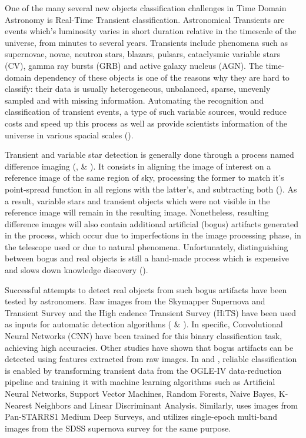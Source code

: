 \documentclass[a4paper,fleqn,usenatbib]{mnras}
\begin{document}
One of the many several new objects classification challenges in Time Domain Astronomy is Real-Time Transient classification. Astronomical Transients are events which's luminosity varies in short duration relative in the timescale of the universe, from minutes to several years. Transients include phenomena such as supernovae, novae, neutron stars, blazars, pulsars, cataclysmic variable stars (CV), gamma ray bursts (GRB) and active galaxy nucleus (AGN). The time-domain dependency of these objects is one of the reasons why they are hard to classify: their data is usually heterogeneous, unbalanced, sparse, unevenly sampled and with missing information. Automating the recognition and classification of transient events, a type of such variable sources, would reduce costs and speed up this process as well as provide scientists information of the universe in various spacial scales (\cite{2011arXiv1110.4655D}).

Transient and variable star detection is generally done through a process named difference imaging (\cite{1507.05137}, \cite{1608.01733} \& \cite{1708.02850}). It consists in aligning the image of interest on a reference image of the same region of sky, processing the former to match it's point-spread function in all regions with the latter's, and subtracting both (\cite{astro-ph/9712287}). As a result, variable stars and transient objects which were not visible in the reference image will remain in the resulting image. Nonetheless, resulting difference images will also contain additional artificial (bogus) artifacts generated in the process, which occur due to imperfections in the image processing phase, in the telescope used or due to natural phenomena. Unfortunately, distinguishing between bogus and real objects is still a hand-made process which is expensive and slows down knowledge discovery (\cite{2011arXiv1110.4655D}).


Successful attempts to detect real objects from such bogus artifacts have been tested by astronomers. Raw images from the  Skymapper Supernova and Transient Survey and the High cadence Transient Survey (HiTS) have been used as inputs for automatic detection algorithms (\cite{1708.08947} \& \cite{1701.00458}). In specific, Convolutional Neural Networks (CNN) have been trained for this binary classification task, achieving high accuracies. Other studies have shown that bogus artifacts can be detected using features extracted from raw images. In \cite{1601.06151} and \cite{1601.06320}, reliable classification is enabled by transforming transient data from the OGLE-IV data-reduction pipeline and training it with machine learning algorithms such as Artificial Neural Networks, Support Vector Machines, Random Forests, Naive Bayes, K-Nearest Neighbors and Linear Discriminant Analysis. Similarly, \cite{1501.05470} uses images from Pan-STARRS1 Medium Deep Surveys, and \cite{1407.4118} utilizes single-epoch multi-band images from the SDSS supernova survey for the same purpose.
\end{document}
